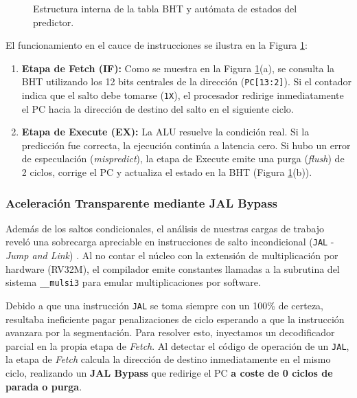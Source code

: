 \documentclass[10pt,a4paper]{article}
\begin{document}
\begin{figure}[H]
\caption{Estructura interna de la tabla BHT y autómata de estados del predictor.}
\label{fig:bht_complete_diagram}
\end{figure}
\shorthandon{<>} 

El funcionamiento en el cauce de instrucciones se ilustra en la Figura \ref{fig:bht_complete_diagram}:
\begin{enumerate}
    \item \textbf{Etapa de Fetch (IF):} Como se muestra en la Figura \ref{fig:bht_complete_diagram}(a), se consulta la BHT utilizando los 12 bits centrales de
    la dirección (\texttt{PC[13:2]}). Si el contador indica que el salto debe tomarse (\texttt{1X}), el procesador redirige inmediatamente el PC hacia la
    dirección de destino del salto en el siguiente ciclo.
    \item \textbf{Etapa de Execute (EX):} La ALU resuelve la condición real. Si la predicción fue correcta, la ejecución continúa a latencia cero. Si hubo un
    error de especulación (\textit{mispredict}), la etapa de Execute emite una purga (\textit{flush}) de 2 ciclos, corrige el PC y actualiza el estado en la BHT
    (Figura \ref{fig:bht_complete_diagram}(b)).
\end{enumerate}

\subsubsection{Aceleración Transparente mediante JAL Bypass}
Además de los saltos condicionales, el análisis de nuestras cargas de trabajo reveló una sobrecarga apreciable en instrucciones de salto incondicional
(\texttt{JAL} - \textit{Jump and Link}) \cite{riscv_spec}. Al no contar el núcleo con la extensión de multiplicación por hardware (RV32M), el compilador emite constantes llamadas
a la subrutina del sistema \texttt{\_\_mulsi3} para emular multiplicaciones por software. %

Debido a que una instrucción \texttt{JAL} se toma siempre con un 100\% de certeza, resultaba ineficiente pagar penalizaciones de ciclo esperando a que la
instrucción avanzara por la segmentación. Para resolver esto, inyectamos un decodificador parcial en la propia etapa de \textit{Fetch}. Al detectar el código
de operación de un \texttt{JAL}, la etapa de \textit{Fetch} calcula la dirección de destino inmediatamente en el mismo ciclo, realizando un \textbf{JAL Bypass}
que redirige el PC \textbf{a coste de 0 ciclos de parada o purga}.
\end{document}
